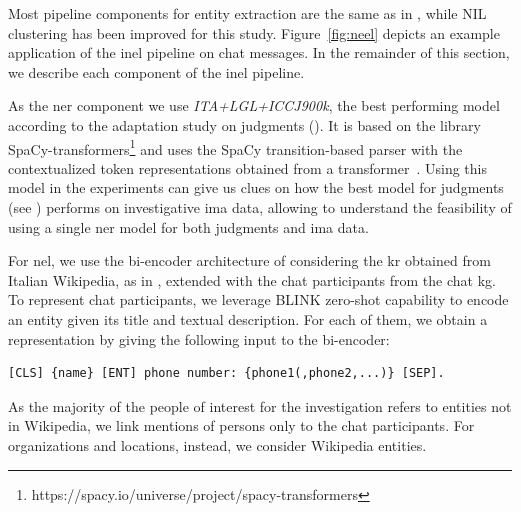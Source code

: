 Most pipeline components for entity extraction are the same as in ,
while NIL clustering has been improved for this study. 
Figure~\ref{fig:neel} depicts an example application of the \ac{inel} pipeline on chat messages.
In the remainder of this section, we describe each component of the \ac{inel} pipeline.

As the \ac{ner} component we use \emph{ITA+LGL+ICCJ900k}, the best performing model according to the adaptation study on judgments (). It is based on the library SpaCy-transformers\footnote{https://spacy.io/universe/project/spacy-transformers} and uses the SpaCy transition-based parser with the contextualized token representations obtained from a transformer~\cite{vaswani_transformers_2017}.
Using this model in the experiments can give us clues on how the best model for judgments (see ) performs on investigative \ac{ima} data, allowing to understand the feasibility of using a single \ac{ner} model for both judgments and \ac{ima} data.



For \ac{nel}, we use the bi-encoder architecture of \blinkita considering the \ac{kr} obtained from Italian Wikipedia, as in , extended with the chat participants from the chat \ac{kg}.
To represent chat participants, we leverage BLINK zero-shot capability to encode an entity given its title and textual description. For each of them, we obtain a representation by giving the following input to the bi-encoder:
\begin{lstlisting}
[CLS] {name} [ENT] phone number: {phone1(,phone2,...)} [SEP].
\end{lstlisting}
As the majority of the people of interest for the investigation refers to entities not in Wikipedia, we link mentions of persons only to the chat participants. For organizations and locations, instead, we consider Wikipedia entities.

